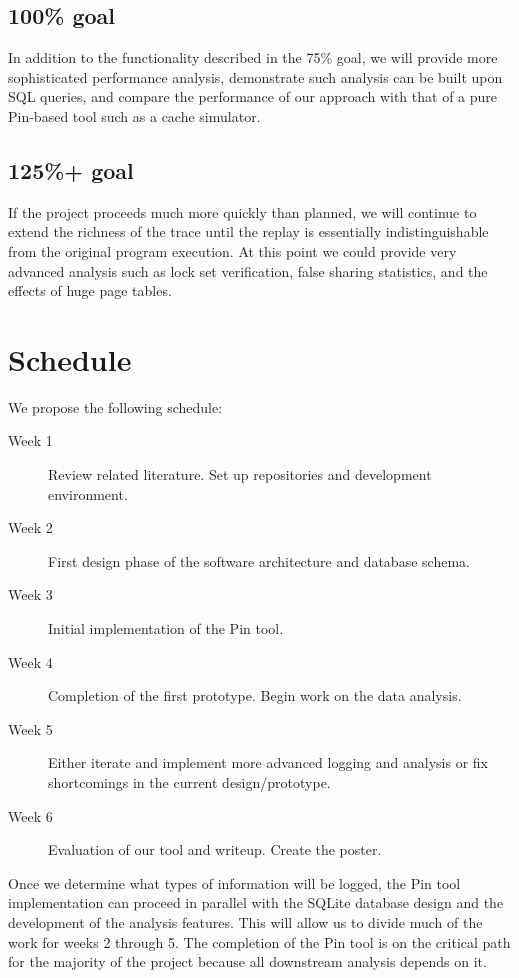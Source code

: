 \documentclass{article}
\begin{document}
\subsection*{100\% goal}
In addition to the functionality described in the 75\% goal,
we will provide more sophisticated performance analysis,
demonstrate such analysis can be built upon SQL queries,
and compare the performance of our approach with that of a
pure Pin-based tool such as a cache simulator.

\subsection*{125\%+ goal}
If the project proceeds much more quickly than planned,
we will continue to extend the richness of the trace until
the replay is essentially indistinguishable from the original
program execution.  At this point we could provide very
advanced analysis such as lock set verification, false
sharing statistics, and the effects of huge page tables.

\section{Schedule}
We propose the following schedule:

\begin{description}
	\item[Week 1] Review related literature.  Set up repositories
		and development environment.
	\item[Week 2] First design phase of the software architecture
		and database schema.
	\item[Week 3] Initial implementation of the Pin tool.
	\item[Week 4] Completion of the first prototype.  Begin work
		on the data analysis.
	\item[Week 5] Either iterate and implement more advanced
		logging and analysis or fix shortcomings in the current design/prototype.
	\item[Week 6] Evaluation of our tool and writeup.  Create the
		poster.
\end{description}

Once we determine what types of information will be logged, the Pin
tool implementation can proceed in parallel with the SQLite database
design and the development of the analysis features.  This will allow
us to divide much of the work for weeks 2 through 5.  The completion
of the Pin tool is on the critical path for the majority of the project
because all downstream analysis depends on it.
\end{document}
